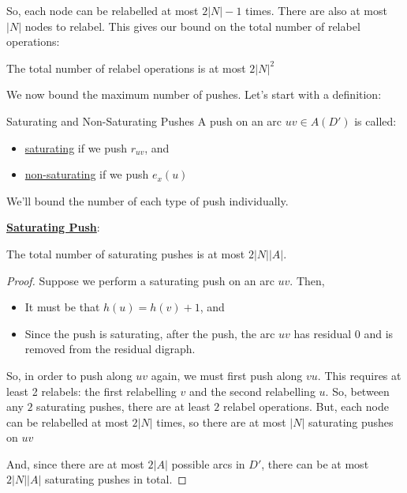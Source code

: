 So, each node can be relabelled at most $2|N| - 1$ times. There are also  at most $|N|$ nodes to relabel. This gives our bound on the total number of relabel operations:
\begin{corollary}{}{}
    The total number of relabel operations is at most $2|N|^2$
\end{corollary}

We now bound the maximum number of pushes.
Let's start with a definition:
\begin{definition}{Saturating and Non-Saturating Pushes}{}
    A push on an arc $uv \in A(D')$ is called:
    \begin{itemize}
        \item \underline{saturating} if we push $r_{uv}$, and
        \item \underline{non-saturating} if we push $e_x(u)$
    \end{itemize} 
\end{definition}

We'll bound the number of each type of push individually.

\underline{\textbf{Saturating Push}}: 
\begin{theorem}{}{}
    The total number of saturating pushes is at most $2|N||A|$. 
\end{theorem}
\begin{proof}
    Suppose we perform a saturating push on an arc $uv$. Then,
    \begin{itemize}
        \item It must be that $h(u) = h(v) + 1$, and
        \item Since the push is saturating, after the push, the arc $uv$ has residual $0$ and is removed from the residual digraph.
    \end{itemize}
    So, in order to push along $uv$ again, we must first push along $vu$. 
    This requires at least 2 relabels: the first relabelling $v$ and the second relabelling $u$.
    So, between any $2$ saturating pushes, there are at least $2$ relabel operations.
    But, each node can be relabelled at most $2|N|$ times, so there are at most $|N|$ saturating pushes on $uv$

    And, since there are at most $2|A|$ possible arcs in $D'$, there can be at most $2|N||A|$ saturating pushes in total.
\end{proof}

